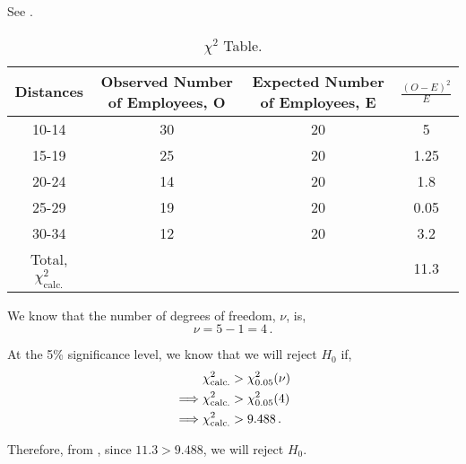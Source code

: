 \begin{subquestions}
\begin{subsubquestions}
\subsubquestion

See .
\begin{table}[H]
	\centering
	\begin{tabular}{|c|c|c|c|}
		\hline
		Distances & Observed Number of Employees, O & Expected Number of Employees, E & $\frac{(O-E)^2}{E}$\\
		\hline 
		10-14 & 30 & 20 & 5 \\
		15-19 & 25 & 20 & 1.25 \\
		20-24 & 14 & 20 & 1.8 \\
		25-29 & 19 & 20 & 0.05 \\
		30-34 & 12 & 20 & 3.2 \\
		\hline
		Total, $\chi^2_{\text{calc.}}$ & & & 11.3 \\
		\hline
	\end{tabular}
	\caption{\label{2010:q4:ChiTab} $\chi^2$ Table.}
\end{table}	

We know that the number of degrees of freedom, $\nu$, is,
\begin{equation}
	\nu = 5-1 = 4\,.
\end{equation}

At the 5\% significance level, we know that we will reject $H_0$ if,
\begin{align}
	&\chi^2_{\text{calc.}} > \chi^2_{0.05}(\nu) \nonumber \\
	\implies & \chi^2_{\text{calc.}} > \chi^2_{0.05}(4) \nonumber \\
	\implies & \chi^2_{\text{calc.}} > 9.488 \,.
\end{align} 

Therefore, from , since $11.3>9.488$, we will reject $H_0$.
\end{subsubquestions}

\end{subquestions}
